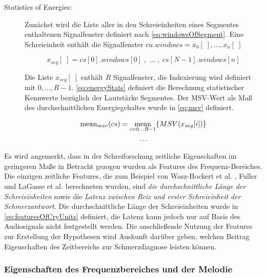 \begin{description}
\item[Statistics of Energies:] Zunächst wird die Liste aller in den Schreieinheiten eines Segmentes enthaltenen Signalfenster definiert nach \autoref{eq:windowsOfSegment}. Eine Schreieinheit enthält die Signalfenster $cu.windows = x_0[\;],\ldots,x_n[\;]$

\begin{equation}
x_{seg}[\; ] = cs[0].windows[0] \;  , \; \ldots \; , \; cs[N-1].windows[n] 
\label{eq:windowsOfSegment}
\end{equation}

Die Liste $x_{seg}[\; ]$ enthält $R$ Signalfenster, die Indexierung wird definiert mit $0, \ldots, R-1$.  \autoref{eq:energyStats} definiert die Berechnung statistischer Kennwerte bezüglich der \glqq Lautstärke Segmentes\grqq. Der MSV-Wert als Maß des durchschnittlichen Energiegehaltes wurde in \autoref{eq:msv} definiert.

\begin{equation}
\begin{gathered}
\text{mean}_{msv}(cs) = \operatorname*{mean}_{i = 0 \ldots R-1}\{MSV(x_{seg}[i])\} \\
\ldots
\end{gathered}
\label{eq:energyStats}
\end{equation}

\end{description}

Es wird angemerkt, dass in der Schreiforschung zeitliche Eigenschaften im geringeren Maße in Betracht gezogen wurden als Features des Frequenz-Bereiches. Die einzigen zeitliche Features, die zum Beispiel von Wasz-Hockert et al. \cite{25years}, Fuller \cite{threeCryTypes} und LaGasse et al. \cite{parentalPerception} berechneten wurden, sind \emph{die durchschnittliche Länge der Schreieinheiten} sowie die \emph{Latenz zwischen Reiz und erster Schreieinheit der Schmerzantwort}. Die durchschnittliche Länge der Schreieinheiten wurde in \autoref{eq:featuresOfCryUnits} definiert, die Latenz kann jedoch nur auf Basis des Audiosignals nicht festgestellt werden. Die anschließende Nutzung der Features zur Erstellung der Hypothesen wird Auskunft darüber geben, welchen Beitrag Eigenschaften des Zeitbereichs zur Schmerzdiagnose leisten können.

\subsubsection{Eigenschaften des Frequenzbereiches und der Melodie}

